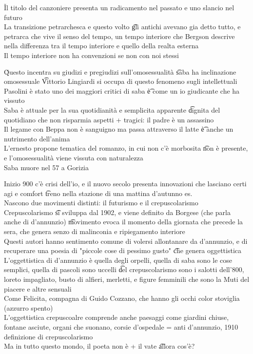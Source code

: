 \documentclass[12pt]{article}
\begin{document}
\v

Il titolo del canzoniere presenta un radicamento nel passato e uno slancio nel futuro \\
La transizione petrarchesca e questo volto \t gli antichi avevano gia detto tutto, e petrarca che vive il senso del tempo, un tempo interiore che Bergson descrive nella differenza tra il tempo interiore e quello della realta esterna \\
Il tempo interiore non ha convenzioni se non con noi stessi

\v

Questo incentra su giudizi e pregiudizi sull'omosessualità \t saba ha inclinazione omosessuale \t Vittorio Lingiardi si occupa di questo fenomeno sugli intellettuali \\
Pasolini è stato uno dei maggiori critici di saba \t è come un io giudicante che ha vissuto \\
Saba è attuale per la sua quotidianità e semplicita apparente \t dignita del quotidiano che non risparmia aspetti + tragici: il padre è un assassino \\
Il legame con Beppa non è sanguigno ma passa attraverso il latte \t è anche un nutrimento dell'anima \\
L'ernesto propone tematica del romanzo, in cui non c'è morbosita \t non è presente, e l'omosessualità viene vissuta con naturalezza \\
Saba muore nel 57 a Gorizia

\s[Crepuscolarismo]
Inizio 900 c'è crisi dell'io, e il nuovo secolo presenta innovazioni che lasciano certi agi e comfort \t treno nella stazione di una mattina d'autunno es. \\
Nascono due movimenti distinti: il futurismo e il crepuscolarismo \\
Crepuscolarismo \t si sviluppa dal 1902, e viene definito da Borgese (che parla anche di d'annunzio) \t movimento evoca il momento della giornata che precede la sera, che genera senzo di malinconia e ripiegamento interiore \\
Questi autori hanno sentimento comune di volersi allontanare da d'annunzio, e di recuperare una poesia di "piccole cose di pessimo gusto" \t che genera oggettistica \\
L'oggettistica di d'annunzio è quella degli orpelli, quella di saba sono le cose semplici, quella di pascoli sono uccelli \t del crepuscolarismo sono i salotti dell'800, loreto impagliato, busto di alfieri, merletti, e figure femminili che sono la Muti del piacere e altre sensuali \\
Come Felicita, compagna di Guido Cozzano, che hanno gli occhi color stoviglia (azzurro spento) \\
L'oggettistica crepuscoalre comprende anche paesaggi come giardini chiuse, fontane asciute, organi che suonano, corsie d'ospedale = anti d'annunzio, 1910 definizione di crepuscolarismo \\
Ma in tutto questo mondo, il poeta non è + il vate \t allora cos'è?
\end{document}
